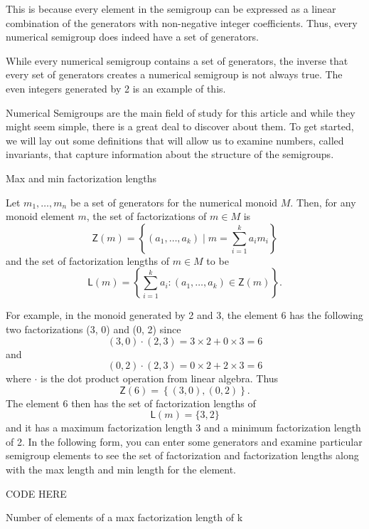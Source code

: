 \documentclass{article}
\begin{document}
This is because every element in the semigroup can be expressed as a linear combination of the generators with non-negative integer coefficients. Thus, every numerical semigroup does indeed have a set of generators.

While every numerical semigroup contains a set of generators, the inverse that every set of generators creates a numerical semigroup is not always true. The even integers generated by 2 is an example of this. 


Numerical Semigroups are the main field of study for this article and while they might seem simple, there is a great deal to discover about them. To get started, we will lay out some definitions that will allow us to examine numbers, called invariants, that capture information about the structure of the semigroups.

Max and min factorization lengths

Let \( m_1, \ldots, m_n \) be a set of generators for the numerical monoid \( M \). Then, for any monoid element \(m \), the set of factorizations of \(m \in M \) is
\[
	\mathsf{Z}(m) = \left \{ (a_1, \ldots, a_k) \mid m =
\sum_{i=1}^{k} a_im_i \right \}
\]
and the set of factorization lengths of \(m \in M\) to be
\[
	\mathsf{L}(m) = \left\{\sum_{i = 1}^{k} a_i : (a_1, \ldots, a_k) \in \mathsf{Z}(m)\right\}.
\]

For example, in the monoid generated by 2 and 3, the element 6 has the following two factorizations (3, 0) and (0, 2) since
\[
	(3, 0) \cdot (2, 3) = 3 \times 2 + 0 \times 3 = 6
\]
and
\[
	(0, 2) \cdot (2, 3) = 0 \times 2 + 2 \times 3 = 6
\]
where \( \cdot \) is the dot product operation from linear algebra. Thus
\[
	\mathsf{Z}(6) = \left \{ (3, 0), (0, 2) \right \}.
\]
The element 6 then has the set of factorization lengths of
\[
	\mathsf{L}(m) = \{ 3, 2 \}
\]
and it has a maximum factorization length 3 and a minimum factorization length of 2. In the following form, you can enter some generators and examine particular semigroup elements to see the set of factorization and factorization lengths along with the max length and min length for the element.

CODE HERE

Number of elements of a max factorization length of k
\end{document}
